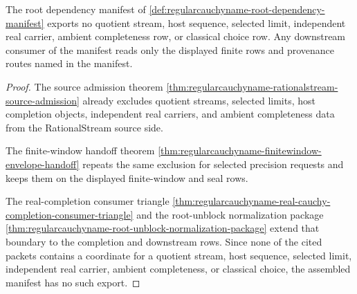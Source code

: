 \begin{theorem}
\label{thm:regularcauchyname-root-dependency-manifest-non-escape}
The root dependency manifest of \autoref{def:regularcauchyname-root-dependency-manifest} exports no quotient stream, host sequence, selected limit, independent real carrier, ambient completeness row, or classical choice row. Any downstream consumer of the manifest reads only the displayed finite rows and provenance routes named in the manifest.
\end{theorem}
\begin{proof}
The source admission theorem \autoref{thm:regularcauchyname-rationalstream-source-admission} already excludes quotient streams, selected limits, host completion objects, independent real carriers, and ambient completeness data from the RationalStream source side.

The finite-window handoff theorem \autoref{thm:regularcauchyname-finitewindow-envelope-handoff} repeats the same exclusion for selected precision requests and keeps them on the displayed finite-window and seal rows.

The real-completion consumer triangle \autoref{thm:regularcauchyname-real-cauchy-completion-consumer-triangle} and the root-unblock normalization package \autoref{thm:regularcauchyname-root-unblock-normalization-package} extend that boundary to the completion and downstream rows. Since none of the cited packets contains a coordinate for a quotient stream, host sequence, selected limit, independent real carrier, ambient completeness, or classical choice, the assembled manifest has no such export.
\end{proof}

